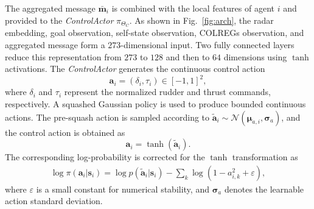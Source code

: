 \documentclass[final,5p,times,twocolumn]{elsarticle}
\begin{document}
{The aggregated message $\bar{\mathbf{m}}_i$ is combined with the local
features of agent $i$ and provided to the \textit{ControlActor}
$\pi_{\Theta_C}$. As shown in Fig.~\ref{fig:arch}, the radar embedding,
goal observation, self-state observation, COLREGs observation, and
aggregated message form a $273$-dimensional input. Two fully connected
layers reduce this representation from $273$ to $128$ and then to $64$
dimensions using $\tanh$ activations.
The \textit{ControlActor} generates the continuous control action
\begin{equation}
\mathbf{a}_i
=(\delta_i,\tau_i)
\in[-1,1]^2,
\end{equation}
where $\delta_i$ and $\tau_i$ represent the normalized rudder and thrust
commands, respectively. A squashed Gaussian policy is used to produce
bounded continuous actions. The pre-squash action is sampled according to
$\tilde{\mathbf{a}}_i
\sim\mathcal{N}
\left(\boldsymbol{\mu}_{a,i},\boldsymbol{\sigma}_a
\right)$,
and the control action is obtained as
\begin{equation}
\mathbf{a}_i
=\tanh
\left(
\tilde{\mathbf{a}}_i
\right).
\end{equation}
The corresponding log-probability is corrected for the $\tanh$
transformation as
\begin{align}
\log \pi(\mathbf{a}_i|\mathbf{s}_i)
=\log p(\tilde{\mathbf{a}}_i|\mathbf{s}_i)-\sum_k
\log
\left(
1-a_{i,k}^2+\varepsilon
\right),
\end{align}
where $\varepsilon$ is a small constant for numerical stability, and
$\boldsymbol{\sigma}_a$ denotes the learnable action standard deviation.
}

\end{document}
